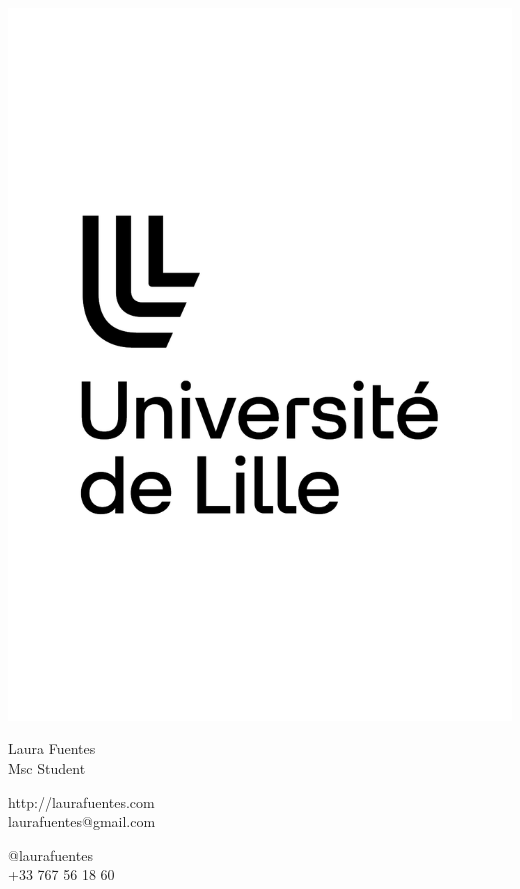 \documentclass{article}
\begin{document}
\centering \includegraphics[width=.25\linewidth]{logo}\\[5pt]
\parbox{2in}{\Large \centering Laura Fuentes\\[1pt]
\normalsize Msc Student}

\vfill
\raggedright
\begin{multicols}{2}
http://laurafuentes.com\\
laurafuentes@gmail.com

\columnbreak
\raggedleft
@laurafuentes\\
+33 767 56 18 60%
\end{multicols}%
\end{document}
